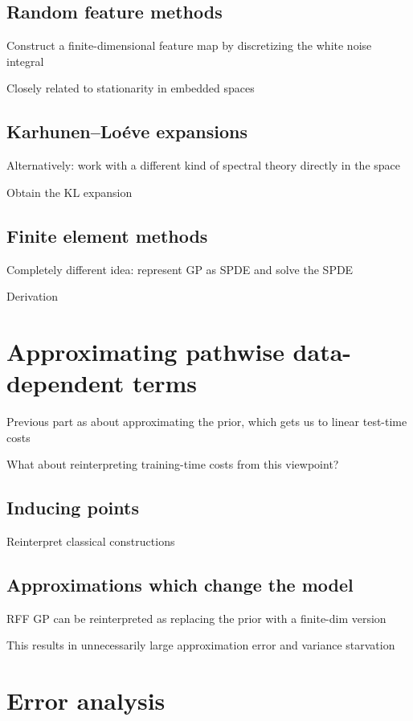 \documentclass[11pt]{book}
\begin{document}
\subsection{Random feature methods}

Construct a finite-dimensional feature map by discretizing the white noise integral

Closely related to stationarity in embedded spaces

\subsection{Karhunen--Loéve expansions}

Alternatively: work with a different kind of spectral theory directly in the space

Obtain the KL expansion

\subsection{Finite element methods}

Completely different idea: represent GP as SPDE and solve the SPDE

Derivation

\section{Approximating pathwise data-dependent terms}

Previous part as about approximating the prior, which gets us to linear test-time costs

What about reinterpreting training-time costs from this viewpoint?

\subsection{Inducing points}

Reinterpret classical constructions

\subsection{Approximations which change the model}

RFF GP can be reinterpreted as replacing the prior with a finite-dim version

This results in unnecessarily large approximation error and variance starvation

\section{Error analysis}
\end{document}

